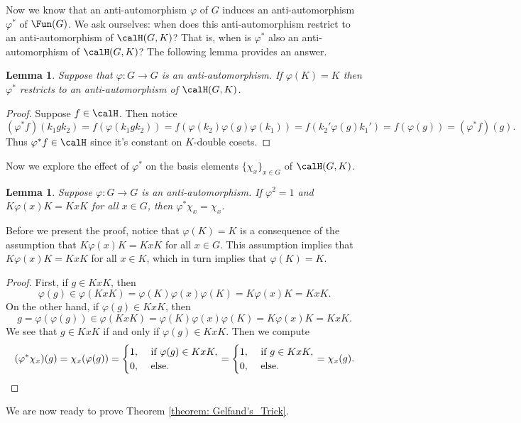 \documentclass[11pt]{amsart}
\newtheorem{lem}[thm]{Lemma}
\theoremstyle{remark}
\begin{document}
Now we know that an anti-automorphism $\varphi$ of $G$ induces an anti-automorphism $\varphi^\ast$ of $\Fun(G)$.
We ask ourselves: when does this anti-automorphism restrict to an anti-automorphism of $\calH(G,K)$?
That is, when is $\varphi^\ast$ also an anti-automorphism of $\calH(G,K)$? The following lemma provides an answer.
\begin{lem}
	Suppose that $\varphi\colon G\to G$ is an anti-automorphism.
	If $\varphi(K)=K$ then $\varphi^\ast$ restricts to an anti-automorphism of $\calH(G,K)$.
\end{lem}
\begin{proof}
	Suppose $f\in\calH$.
	Then notice
	\[
		(\varphi^\ast f)(k_1gk_2) = f(\varphi(k_1gk_2)) = f(\varphi(k_2)\varphi(g)\varphi(k_1)) = f(k_2'\varphi(g)k_1') = f(\varphi(g)) = (\varphi^\ast f)(g).
	\]
	Thus $\varphi^\ast f \in\calH$ since it's constant on $K$-double cosets.
\end{proof}
Now we explore the effect of $\varphi^\ast$ on the basis elements $\{\chi_x\}_{x\in G}$ of $\calH(G,K)$.
\begin{lem}\label{lem: id_on_basis}
	Suppose $\varphi\colon G\to G$ is an anti-automorphism.
	If $\varphi^2=1$ and $K\varphi(x)K=KxK$ for all $x\in G$, then $\varphi^\ast\chi_x=\chi_x$.
\end{lem}
Before we present the proof, notice that $\varphi(K)=K$ is a consequence of the assumption that $K\varphi(x)K=KxK$ for all $x\in G$.
This assumption implies that $K\varphi(x)K=KxK$ for all $x\in K$, which in turn implies that $\varphi(K)=K$.
\begin{proof}
	First, if $g\in KxK$, then
	\[
		\varphi(g)\in \varphi(KxK) = \varphi(K)\varphi(x)\varphi(K) = K\varphi(x)K = KxK.
	\]
	On the other hand, if $\varphi(g)\in KxK$, then
	\[
		g = \varphi(\varphi(g)) \in \varphi(KxK) = \varphi(K)\varphi(x)\varphi(K) = K\varphi(x)K = KxK.
	\]
	We see that $g\in KxK$ if and only if $\varphi(g)\in KxK$.
	Then we compute
	\[
		(\varphi^\ast\chi_x)(g) = \chi_x(\varphi(g)) = \begin{cases}
			1,\  & \text{if}\ \varphi(g)\in KxK, \\
			0,\  & \text{else}.
		\end{cases} = \begin{cases}
			1,\  & \text{if}\ g\in KxK, \\
			0,\  & \text{else}.
		\end{cases} = \chi_x(g).\qedhere
	\]
\end{proof}
We are now ready to prove Theorem \ref{theorem: Gelfand's_Trick}.
\end{document}
